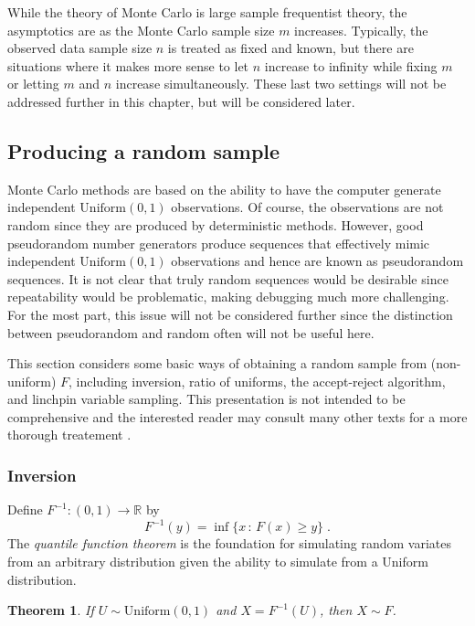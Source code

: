 \documentclass[12pt]{article}
\theoremstyle{plain}
\newtheorem{thm}{Theorem}[section]
\theoremstyle{definition}
\theoremstyle{remark}
\begin{document}
While the theory of Monte Carlo is large sample frequentist theory,
the asymptotics are as the Monte Carlo sample size $m$ increases.
Typically, the observed data sample size $n$ is treated as fixed and
known, but there are situations where it makes more sense to let $n$
increase to infinity while fixing $m$ or letting $m$ and $n$ increase
simultaneously. These last two settings will not be addressed further
in this chapter, but will be considered later.

\subsection{Producing a random sample}
\label{gofmc:sec:Producing}

Monte Carlo methods are based on the ability to have the computer
generate independent $\text{Uniform}(0,1)$ observations.  Of course,
the observations are not random since they are produced by
deterministic methods.  However, good pseudorandom number generators
produce sequences that effectively mimic independent
$\text{Uniform}(0,1)$ observations and hence are known as pseudorandom
sequences.  It is not clear that truly random sequences would be
desirable since repeatability would be problematic, making debugging
much more challenging.  For the most part, this issue will not be
considered further since the distinction between pseudorandom and
random often will not be useful here.

This section considers some basic ways of obtaining a random sample
from (non-uniform) $F$, including inversion, ratio of uniforms, the
accept-reject algorithm, and linchpin variable sampling.  This
presentation is not intended to be comprehensive and the
interested reader may consult many other texts for a more thorough
treatement \cite[e.g.][]{devr:1986, fish:1996, robe:case:2004}.

\subsubsection{Inversion} 
Define $F^{-1} : (0,1) \to \mathbb{R}$ by
$$
F^{-1}(y) = \inf \{ x\, : \, F(x) \ge y\} \; .
$$
The \textit{quantile function theorem} is the foundation for
simulating random variates from an arbitrary distribution given the
ability to simulate from a Uniform distribution.

\begin{thm}\label{thm:quantile function}
If $U \sim \text{Uniform}(0,1)$ and $X = F^{-1}(U)$, then $X \sim F$.
\end{thm}
\end{document}
